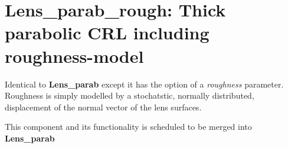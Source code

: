 \section{Lens\_parab\_rough: Thick parabolic CRL including roughness-model}
\label{s:lens-parab-rough}

Identical to \textbf{Lens\_parab} except it has the option of a \textit{roughness} parameter.
Roughness is simply modelled by a stochatstic, normally distributed, displacement of the normal vector of the lens surfaces.

This component and its functionality is scheduled to be merged into \textbf{Lens\_parab}

